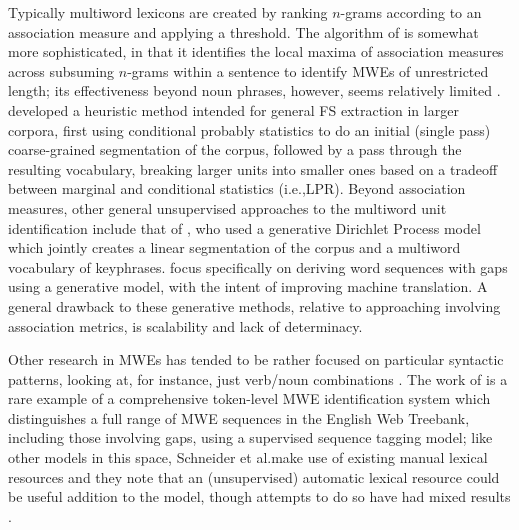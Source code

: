 \documentclass[11pt,letterpaper]{article}
\makeatletter
\def \ie {i.e.,\@ }
\def \al {al.\@ }
\makeatother
\begin{document}
Typically multiword lexicons are created by ranking $n$-grams according to an association measure and applying a threshold. The algorithm of  is somewhat more sophisticated, in that it identifies the local maxima of association measures across subsuming $n$-grams within a sentence to identify MWEs of unrestricted length; its effectiveness beyond noun phrases, however, seems relatively limited \cite{Ramisch12}.  developed a heuristic method intended for general FS extraction in larger corpora, first using conditional probably statistics to do an initial (single pass) coarse-grained segmentation of the corpus, followed by a pass through the resulting vocabulary, breaking larger units into smaller ones based on a tradeoff between marginal and conditional statistics (\ie LPR). Beyond association measures, other general unsupervised approaches to the multiword unit identification include that of , who used a generative Dirichlet Process model which jointly creates a linear segmentation of the corpus and a multiword vocabulary of keyphrases.  focus specifically on deriving word sequences with gaps using a generative model, with the intent of improving machine translation. A general drawback to these generative methods, relative to approaching involving association metrics, is scalability and lack of determinacy.

Other research in MWEs has tended to be rather focused on particular syntactic patterns, looking at, for instance, just verb/noun combinations \cite{Fazly09}. The work of  is a rare example of a comprehensive token-level MWE identification system which distinguishes a full range of MWE sequences in the English Web Treebank, including those involving gaps, using a supervised sequence tagging model; like other models in this space, Schneider et \al make use of existing manual lexical resources and they note that an (unsupervised) automatic lexical resource could be useful addition to the model, though attempts to do so have had mixed results \cite{Riedl16}. 
\end{document}
